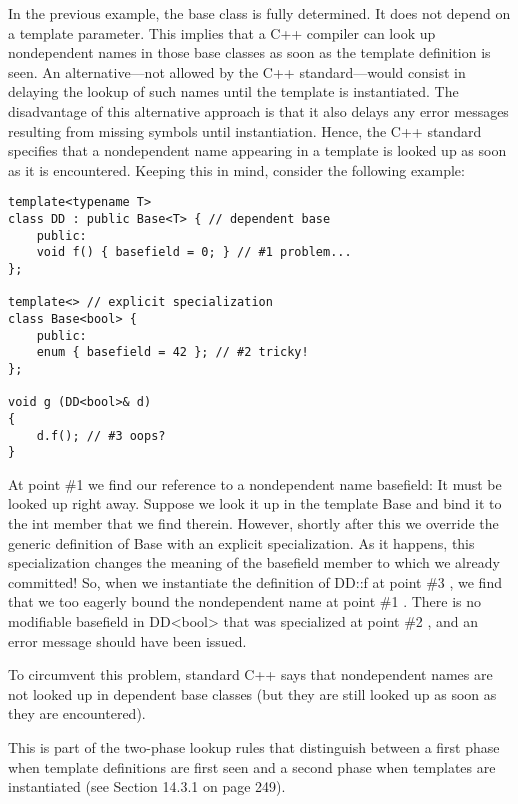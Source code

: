 
In the previous example, the base class is fully determined. It does not depend on a template parameter. This implies that a C++ compiler can look up nondependent names in those base classes as soon as the template definition is seen. An alternative—not allowed by the C++ standard—would consist in delaying the lookup of such names until the template is instantiated. The disadvantage of this alternative approach is that it also delays any error messages resulting from missing symbols until instantiation. Hence, the C++ standard specifies that a nondependent name appearing in a template is looked up as soon as it is encountered. Keeping this in mind, consider the following example:

\begin{lstlisting}[style=styleCXX]
template<typename T>
class DD : public Base<T> { // dependent base
	public:
	void f() { basefield = 0; } // #1 problem...
};

template<> // explicit specialization
class Base<bool> {
	public:
	enum { basefield = 42 }; // #2 tricky!
};

void g (DD<bool>& d)
{
	d.f(); // #3 oops?
}
\end{lstlisting}

At point \#1 we find our reference to a nondependent name basefield: It must be looked up right away. Suppose we look it up in the template Base and bind it to the int member that we find therein. However, shortly after this we override the generic definition of Base with an explicit specialization. As it happens, this specialization changes the meaning of the basefield member to which we already committed! So, when we instantiate the definition of DD::f at point \#3 , we find that we too eagerly bound the nondependent name at point \#1 . There is no modifiable basefield in DD<bool> that was specialized at point \#2 , and an error message should have been issued.

To circumvent this problem, standard C++ says that nondependent names are not looked up in dependent base classes (but they are still looked up as soon as they are encountered).

\begin{tcolorbox}[colback=webgreen!5!white,colframe=webgreen!75!black]
\hspace*{0.75cm} This is part of the two-phase lookup rules that distinguish between a first phase when template definitions are first seen and a second phase when templates are instantiated (see Section 14.3.1 on page 249).
\end{tcolorbox}

